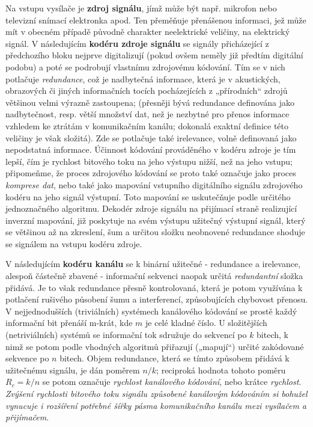     Na vstupu vysílače je \textbf{zdroj signálu}, jímž může být např. mikrofon nebo televizní 
    snímací elektronka apod. Ten pře\-mě\-ňu\-je přenášenou informaci, jež může mít v obecném 
    případě původně charakter neelektrické veličiny, na elektrický signál. V následujícím 
    \textbf{kodéru zdroje signálu} se signály přicházející z předchozího bloku nejprve digitalizují 
    (pokud ovšem neměly již předtím digitální podobu) a poté se podrobují vlastnímu zdrojovému 
    kódování. Tím se v nich potlačuje \emph{redundance}, což je nadbytečná informace, která je v 
    akustických, obrazových či jiných informačních tocích pocházejících z „přírodních“ zdrojů 
    většinou velmi výrazně zastoupena; (přesněji bývá redundance definována jako nadbytečnost, 
    resp. větší množství dat, než je nezbytné pro přenos informace vzhledem ke ztrátám v 
    komunikačním kanálu; dokonalá exaktní definice této veličiny je však složitá). Zde se potlačuje 
    také irelevance, volně definovaná jako nepodstatná informace. Účinnost kódování prováděného v 
    kodéru zdroje je tím lepší, čím je rychlost bitového toku na jeho výstupu nižší, než na jeho 
    vstupu; připomeňme, že proces zdrojového kódování se proto také označuje jako proces 
    \emph{komprese dat}, nebo také jako mapování vstupního digitálního signálu zdrojového kodéru na 
    jeho signál výstupní. Toto mapování se uskutečňuje podle určitého jednoznačného algoritmu. 
    Dekodér zdroje signálu na přijímací straně realizující inverzní mapování, již poskytuje na svém 
    výstupu užitečný výstupní signál, který se většinou až na zkreslení, šum a určitou složku 
    neobnovené redundance shoduje se signálem na vstupu kodéru zdroje.
        
    V následujícím \textbf{kodéru kanálu} se k binární užitečné - redundance a irelevance, alespoň 
    částečně zbavené - informační sekvenci naopak určitá \emph{redundantní} složka přidává. Je to 
    však redundance přesně kontrolovaná, která je potom využívána k potlačení rušivého působení 
    šumu a interferencí, způsobujících chybovost přenosu. V nejjednodušších (triviálních) systémech 
    kanálového kódování se prostě každý informační bit přenáší m-krát, kde \(m\) je celé kladné 
    číslo. U složitějších (netriviálních) systémů se informační tok sdružuje do sekvencí po \(k\) 
    bitech, k nimž se potom podle vhodných algoritmů přiřazují („mapují“) určité zakódované 
    sekvence po \(n\) bitech. Objem redundance, která se tímto způsobem přidává k užitečnému 
    signálu, je dán poměrem \(n/k\); reciproká hodnota tohoto poměru \(R_c = k/n\) se potom 
    označuje \emph{rychlost kanálového kódování}, nebo krátce \emph{rychlost}. \emph{Zvýšení 
    rychlosti bitového toku signálu způsobené kanálovým kódováním si bohužel vynucuje i rozšíření 
    potřebné šířky pásma komunikačního kanálu mezi vysílačem a přijímačem}.
    
